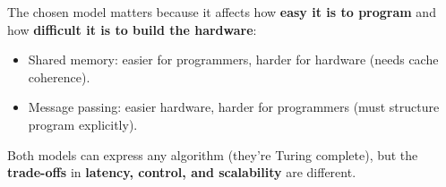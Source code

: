 The chosen model matters because it affects how \textbf{easy it is to program} and how \textbf{difficult it is to build the hardware}:
\begin{itemize}
    \item Shared memory: easier for programmers, harder for hardware (needs cache coherence).
    \item Message passing: easier hardware, harder for programmers (must structure program explicitly).
\end{itemize}
Both models can express any algorithm (they're Turing complete), but the \textbf{trade-offs} in \textbf{latency, control, and scalability} are different.